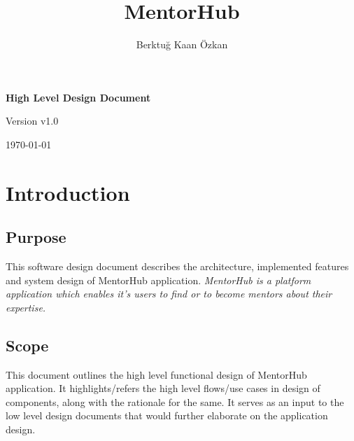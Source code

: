 \documentclass[10pt]{article}
\title{MentorHub}
\author{Berktuğ Kaan Özkan}
\newcommand{\thesubtitle}{High Level Design Document}
\newcommand{\theversion}{v1.0}
\begin{document}
 


\begin{titlepage}
\begin{center}
    \vspace*{1cm}
    
    {\Huge
    
    \textbf{\thetitle}
    
    \vspace{1.0cm}
    
    \textbf{\thesubtitle{}}}
        
    \vspace{1.5cm}

    {\LARGE
    \theauthor

    \vfill
        
    Version \theversion{}
    
    \vspace{0.5cm}
    
    \today{}}
    
    \vspace{0.5cm}
   \end{center}
\end{titlepage}


\tableofcontents
\iftotalfigures
    \newpage
    \listoffigures
\fi
\newpage


\section{Introduction} \label{introduction}


\subsection{Purpose} \label{purpose}
This software design document describes the architecture, implemented features
and system design of MentorHub application. \textit{MentorHub  is a platform
application which enables it's users to find or to become mentors about their expertise.}


\subsection{Scope} \label{scope}
This document outlines the high level functional design of MentorHub application.
It highlights/refers the high level flows/use cases in design of components, along
with the rationale for the same. It serves as an input to the low level design 
documents that would further elaborate on the application design.
\end{document}
